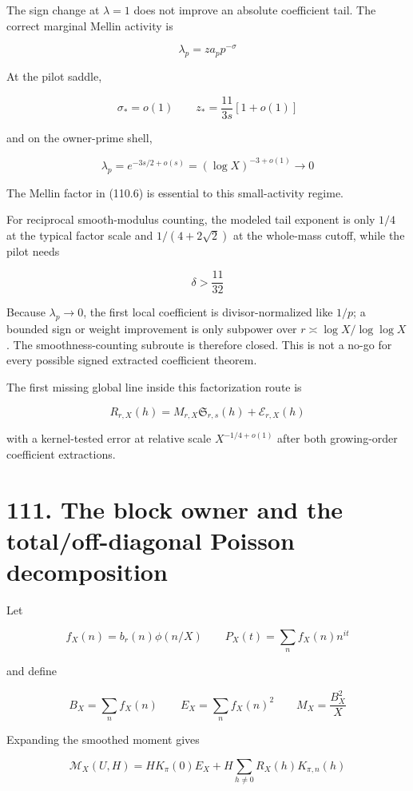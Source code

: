 \documentclass[
  11pt,
]{book}
\begin{document}
The sign change at \(\lambda=1\) does not improve an absolute
coefficient tail. The correct marginal Mellin activity is

\[
\boxed{\lambda_p=za_pp^{-\sigma}}
\tag{110.6}
\]

At the pilot saddle,

\[
\sigma_*=o(1)
\qquad
z_*=\frac{11}{3s}[1+o(1)]
\tag{110.7}
\]

and on the owner-prime shell,

\[
\lambda_p
=e^{-3s/2+o(s)}
=(\log X)^{-3+o(1)}
\longrightarrow0
\tag{110.8}
\]

The Mellin factor in (110.6) is essential to this small-activity regime.

For reciprocal smooth-modulus counting, the modeled tail exponent is
only \(1/4\) at the typical factor scale and \(1/(4+2\sqrt2)\) at the
whole-mass cutoff, while the pilot needs

\[
\delta>\frac{11}{32}
\tag{110.9}
\]

Because \(\lambda_p\to0\), the first local coefficient is
divisor-normalized like \(1/p\); a bounded sign or weight improvement is
only subpower over \(r\asymp\log X/\log\log X\). The smoothness-counting
subroute is therefore closed. This is not a no-go for every possible
signed extracted coefficient theorem.

The first missing global line inside this factorization route is

\[
R_{r,X}(h)
=M_{r,X}\mathfrak S_{r,s}(h)+\mathcal E_{r,X}(h)
\tag{110.10}
\]

with a kernel-tested error at relative scale \(X^{-1/4+o(1)}\) after
both growing-order coefficient extractions.

\section{111. The block owner and the total/off-diagonal Poisson
decomposition}\label{the-block-owner-and-the-totaloff-diagonal-poisson-decomposition}

Let

\[
f_X(n)=b_r(n)\phi(n/X)
\qquad
P_X(t)=\sum_nf_X(n)n^{it}
\tag{111.1}
\]

and define

\[
B_X=\sum_nf_X(n)
\qquad
E_X=\sum_nf_X(n)^2
\qquad
M_X=\frac{B_X^2}{X}
\tag{111.2}
\]

Expanding the smoothed moment gives

\[
\mathcal M_X(U,H)
=HK_\pi(0)E_X
+H\sum_{h\ne0}R_X(h)K_{\pi,n}(h)
\tag{111.3}
\]
\end{document}
